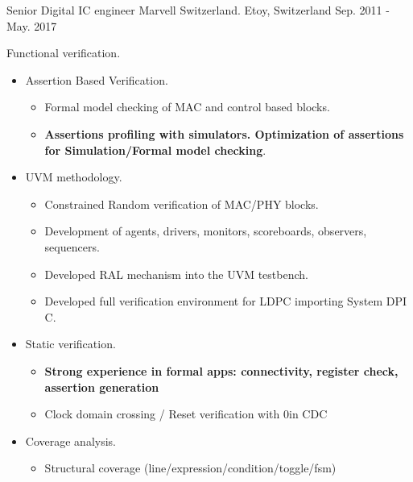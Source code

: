 \begin{cventries}

  \cventry
    {Senior Digital IC engineer} %
    {Marvell Switzerland.} %
    {Etoy, Switzerland} %
    {Sep. 2011 - May. 2017} %
    {
      \begin{cvitems} %
        \item {Functional verification.}
        \begin{itemize}
          \item {Assertion Based Verification.}
          \begin{itemize}
            \item {Formal model checking of MAC and control based blocks.}
            \item {\textbf{Assertions profiling with simulators. Optimization of assertions for Simulation/Formal model checking}.}
          \end{itemize}
          \item {UVM methodology.}
          \begin{itemize}
            \item {Constrained Random verification of MAC/PHY blocks.}
            \item {Development of agents, drivers, monitors, scoreboards, observers, sequencers.}
            \item {Developed RAL mechanism into the UVM testbench.}
            \item {Developed full verification environment for LDPC importing System DPI C.}
          \end{itemize}
          \item {Static verification.}
          \begin{itemize}
            \item {\textbf{Strong experience in formal apps: connectivity, register check, assertion generation}}
            \item {Clock domain crossing / Reset verification with 0in CDC}
          \end{itemize}
          \item {Coverage analysis.}
          \begin{itemize}
            \item {Structural coverage (line/expression/condition/toggle/fsm)}

\end{itemize}
\end{itemize}
\end{cvitems}}
\end{cventries}
